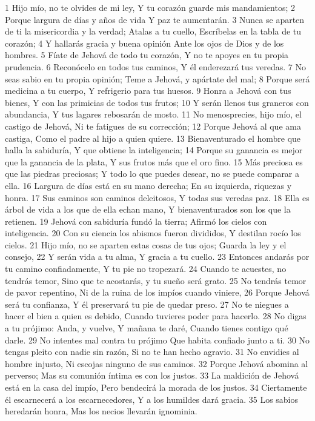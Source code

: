 1 Hijo mío, no te olvides de mi ley,
Y tu corazón guarde mis mandamientos;
2 Porque largura de días y años de vida
Y paz te aumentarán.
3 Nunca se aparten de ti la misericordia y la verdad;
Atalas a tu cuello,
Escríbelas en la tabla de tu corazón;
4 Y hallarás gracia y buena opinión
Ante los ojos de Dios y de los hombres. 
5 Fíate de Jehová de todo tu corazón,
Y no te apoyes en tu propia prudencia.
6 Reconócelo en todos tus caminos,
Y él enderezará tus veredas.
7 No seas sabio en tu propia opinión; 
Teme a Jehová, y apártate del mal;
8 Porque será medicina a tu cuerpo,
Y refrigerio para tus huesos.
9 Honra a Jehová con tus bienes, 
Y con las primicias de todos tus frutos;
10 Y serán llenos tus graneros con abundancia,
Y tus lagares rebosarán de mosto.
11 No menosprecies, hijo mío, el castigo de Jehová,
Ni te fatigues de su corrección; 
12 Porque Jehová al que ama castiga, 
Como el padre al hijo a quien quiere. 
13 Bienaventurado el hombre que halla la sabiduría,
Y que obtiene la inteligencia;
14 Porque su ganancia es mejor que la ganancia de la plata,
Y sus frutos más que el oro fino.
15 Más preciosa es que las piedras preciosas;
Y todo lo que puedes desear, no se puede comparar a ella.
16 Largura de días está en su mano derecha;
En su izquierda, riquezas y honra.
17 Sus caminos son caminos deleitosos,
Y todas sus veredas paz.
18 Ella es árbol de vida a los que de ella echan mano,
Y bienaventurados son los que la retienen.
19 Jehová con sabiduría fundó la tierra;
Afirmó los cielos con inteligencia.
20 Con su ciencia los abismos fueron divididos,
Y destilan rocío los cielos.
21 Hijo mío, no se aparten estas cosas de tus ojos;
Guarda la ley y el consejo,
22 Y serán vida a tu alma,
Y gracia a tu cuello.
23 Entonces andarás por tu camino confiadamente,
Y tu pie no tropezará.
24 Cuando te acuestes, no tendrás temor,
Sino que te acostarás, y tu sueño será grato.
25 No tendrás temor de pavor repentino,
Ni de la ruina de los impíos cuando viniere,
26 Porque Jehová será tu confianza,
Y él preservará tu pie de quedar preso.
27 No te niegues a hacer el bien a quien es debido,
Cuando tuvieres poder para hacerlo.
28 No digas a tu prójimo: Anda, y vuelve,
Y mañana te daré,
Cuando tienes contigo qué darle.
29 No intentes mal contra tu prójimo
Que habita confiado junto a ti.
30 No tengas pleito con nadie sin razón,
Si no te han hecho agravio.
31 No envidies al hombre injusto,
Ni escojas ninguno de sus caminos.
32 Porque Jehová abomina al perverso;
Mas su comunión íntima es con los justos.
33 La maldición de Jehová está en la casa del impío,
Pero bendecirá la morada de los justos.
34 Ciertamente él escarnecerá a los escarnecedores,
Y a los humildes dará gracia. 
35 Los sabios heredarán honra,
Mas los necios llevarán ignominia.

